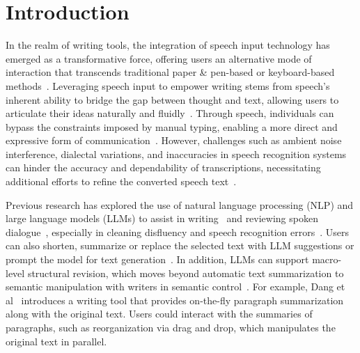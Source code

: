 \section{Introduction}
In the realm of writing tools, the integration of speech input technology has emerged as a transformative force, offering users an alternative mode of interaction that transcends traditional paper \& pen-based or keyboard-based methods~\cite{lin2024rambler, Ruan2018Comparing}. Leveraging speech input to empower writing stems from speech's inherent ability to bridge the gap between thought and text, allowing users to articulate their ideas naturally and fluidly~\cite{lin2024rambler, Mehra2023GistAV, Crystal2005SpeakingOW, Ruan2018Comparing}. Through speech, individuals can bypass the constraints imposed by manual typing, enabling a more direct and expressive form of communication~\cite{lin2024rambler}. However, challenges such as ambient noise interference, dialectal variations, and inaccuracies in speech recognition systems can hinder the accuracy and dependability of transcriptions, necessitating additional efforts to refine the converted speech text~\cite{Karat1999PatternsOE}.

Previous research has explored the use of natural language processing (NLP) and large language models (LLMs) to assist in writing~\cite{Dang2022BeyondTG} and reviewing spoken dialogue~\cite{Li2021HierarchicalSF, Li2023ImprovingAS}, especially in cleaning disfluency and speech recognition errors~\cite{Liao2020ImprovingRF, bassi2023end, Tanaka2018NeuralEC}. Users can also shorten, summarize or replace the selected text with LLM suggestions or prompt the model for text generation~\cite{Yang2022AIAA}. In addition, LLMs can support macro-level structural revision, which moves beyond automatic text summarization to semantic manipulation with writers in semantic control~\cite{Arnold2021GenerativeMC}. For example, Dang et al~\cite{Dang2022BeyondTG} introduces a writing tool that provides on-the-fly paragraph summarization along with the original text. Users could interact with the summaries of paragraphs, such as reorganization via drag and drop, which manipulates the original text in parallel.

